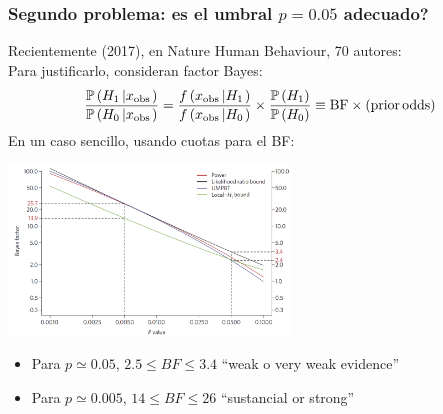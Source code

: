 \documentclass[9pt]{beamer}
\newcommand{\field}[1]{\mathbb{#1}}
\renewcommand{\P}{\field{P}}
\begin{document}
\begin{frame}
  \frametitle{Segundo problema: es el umbral $p = 0.05$ adecuado?}
      \begin{overlayarea}{\textwidth}{\textheight}
  Recientemente (2017), en Nature Human Behaviour, 70 autores:\\
     Para justificarlo, consideran factor Bayes: 
   $$\frac{\P\left({H}_{1}\left|{x}_{{\rm{obs}}}\right.\right)}{\P\left({H}_{0}\left|{x}_{{\rm{obs}}}\right.\right)}=\frac{f\left({x}_{{\rm{obs}}}\left|{H}_{1}\right.\right)}{f\left({x}_{{\rm{obs}}}\left|{H}_{0}\right.\right)}\times \frac{\P\left({H}_{1}\right)}{\P\left({H}_{0}\right)}\equiv {\rm{BF}}\times \left({\rm{prior}}\,{\rm{odds}}\right)
  $$
  En un caso sencillo, usando cuotas para el BF:
  \begin{center}
    \includegraphics[width=7.5cm]{images/redefine_plot}
  \end{center}\vspace{-0.5cm}
  \begin{block}{}
    \begin{itemize}
    \item Para $p \simeq 0.05$, $2.5\leq BF\leq 3.4$ ``weak o very
      weak evidence''
    \item Para $p \simeq 0.005$, $14\leq BF\leq 26$ ``sustancial or strong''
    \end{itemize}
  \end{block}
  
  \end{overlayarea}
\end{frame}
\end{document}
